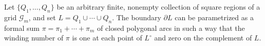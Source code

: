 Let $\{Q_1, \ldots, Q_n\}$ be an arbitrary finite, nonempty collection of square regions of a grid $\mathcal{G}_m$, and set $L = Q_1 \cup \cdots \cup Q_n$. The boundary $\partial L$ can be parametrized as a formal sum $\pi = \pi_1 + \cdots + \pi_m$ of closed polygonal arcs in such a way that the winding number of $\pi$ is one at each point of $L^\circ$ and zero on the complement of $L$.
